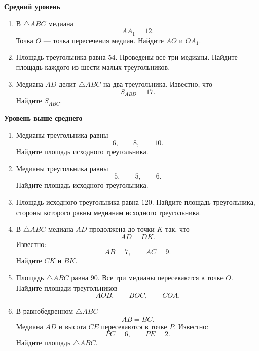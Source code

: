 \documentclass[a4paper,12pt]{article}
\begin{document}
\vspace{4mm}

\textbf{Средний уровень}

\begin{enumerate}[label=\textbf{\arabic*.}]

  \item
  В $\triangle ABC$ медиана
  \[
  AA_1=12.
  \]
  Точка $O$ --- точка пересечения медиан.
  Найдите $AO$ и $OA_1$.

  \item
  Площадь треугольника равна $54$.
  Проведены все три медианы.
  Найдите площадь каждого из шести малых треугольников.

  \item
  Медиана $AD$ делит $\triangle ABC$ на два треугольника.
  Известно, что
  \[
  S_{ABD}=17.
  \]
  Найдите $S_{ABC}$.

\end{enumerate}

\vspace{2mm}

\textbf{Уровень выше среднего}

\begin{enumerate}[label=\textbf{\arabic*.},resume]

  \item
  Медианы треугольника равны
  \[
  6,\qquad 8,\qquad 10.
  \]
  Найдите площадь исходного треугольника.

  \item
  Медианы треугольника равны
  \[
  5,\qquad 5,\qquad 6.
  \]
  Найдите площадь исходного треугольника.

  \item
  Площадь исходного треугольника равна $120$.
  Найдите площадь треугольника, стороны которого равны
  медианам исходного треугольника.

  \item
  В $\triangle ABC$ медиана $AD$ продолжена до точки $K$
  так, что
  \[
  AD=DK.
  \]
  Известно:
  \[
  AB=7,
  \qquad
  AC=9.
  \]
  Найдите $CK$ и $BK$.

  \item
  Площадь $\triangle ABC$ равна $90$.
  Все три медианы пересекаются в точке $O$.
  Найдите площади треугольников
  \[
  AOB,\qquad BOC,\qquad COA.
  \]

  \item
  В равнобедренном $\triangle ABC$
  \[
  AB=BC.
  \]
  Медиана $AD$ и высота $CE$ пересекаются в точке $P$.
  Известно:
  \[
  PC=6,
  \qquad
  PE=2.
  \]
  Найдите площадь $\triangle ABC$.

\end{enumerate}
\end{document}
